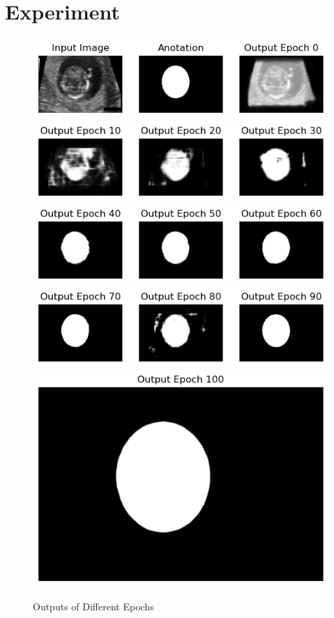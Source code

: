 \documentclass{article}
\begin{document}
\section{Experiment}
\begin{figure}[H]
    \centering
    \includegraphics[width=0.8\linewidth]{Unknown-26.png}
    \includegraphics[width=0.8\linewidth]{Unknown-27.png}
    \includegraphics[width=0.8\linewidth]{Unknown-28.png}
    \includegraphics[width=0.8\linewidth]{Unknown-29.png}
    \includegraphics[width=0.8\linewidth]{Unknown-30.png}
    \caption{Outputs of Different Epochs}
    \label{fig:output}
\end{figure}
\end{document}

